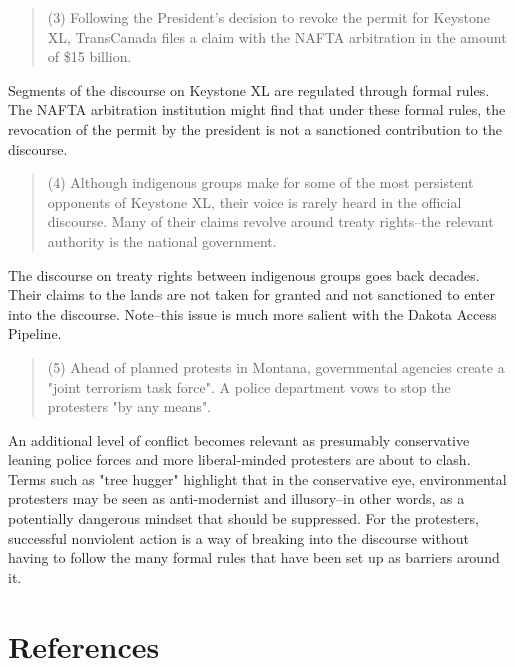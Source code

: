 \documentclass{article}
\begin{document}
	\begin{quote}
		(3) Following the President's decision to revoke the permit for Keystone XL, TransCanada files a claim with the NAFTA arbitration in the amount of \$15 billion.
	\end{quote}

	Segments of the discourse on Keystone XL are regulated through formal rules. The NAFTA arbitration institution might find that under these formal rules, the revocation of the permit by the president is not a sanctioned contribution to the discourse.

	\begin{quote}
		(4) Although indigenous groups make for some of the most persistent opponents of Keystone XL, their voice is rarely heard in the official discourse. Many of their claims revolve around treaty rights--the relevant authority is the national government.
	\end{quote}

	The discourse on treaty rights between indigenous groups goes back decades. Their claims to the lands are not taken for granted and not sanctioned to enter into the discourse. Note--this issue is much more salient with the Dakota Access Pipeline.

	\begin{quote}
		(5) Ahead of planned protests in Montana, governmental agencies create a "joint terrorism task force". A police department vows to stop the protesters "by any means".
	\end{quote}

	An additional level of conflict becomes relevant as presumably conservative leaning police forces and more liberal-minded protesters are about to clash. Terms such as "tree hugger" highlight that in the conservative eye, environmental protesters may be seen as anti-modernist and illusory--in other words, as a potentially dangerous mindset that should be suppressed. For the protesters, successful nonviolent action is a way of breaking into the discourse without having to follow the many formal rules that have been set up as barriers around it.

	\clearpage
	\section*{References}
	\printbibliography[heading=none]
\end{document}
